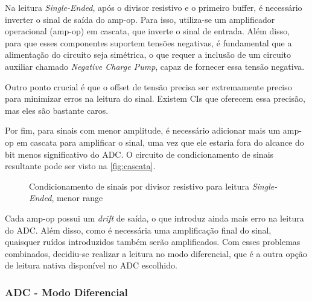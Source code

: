 Na leitura \textit{Single-Ended}, após o divisor resistivo e o primeiro buffer, é necessário inverter o sinal de saída do \gls{amp-op}. Para isso, utiliza-se um amplificador operacional (amp-op) em cascata, que inverte o sinal de entrada. Além disso, para que esses componentes suportem tensões negativas, é fundamental que a alimentação do circuito seja simétrica, o que requer a inclusão de um circuito auxiliar chamado \textit{Negative Charge Pump}, capaz de fornecer essa tensão negativa.

Outro ponto crucial é que o offset de tensão precisa ser extremamente preciso para minimizar erros na leitura do sinal. Existem \gls{CI}s que oferecem essa precisão, mas eles são bastante caros.

Por fim, para sinais com menor amplitude, é necessário adicionar mais um amp-op em cascata para amplificar o sinal, uma vez que ele estaria fora do alcance do bit menos significativo do \gls{ADC}. O circuito de condicionamento de sinais resultante pode ser visto na \autoref{fig:cascata}.

\begin{figure}[htb!]
    \caption{Condicionamento de sinais por divisor resistivo para leitura \textit{Single-Ended}, menor range}
    \label{fig:cascata}
    \fonte{}
\end{figure}

Cada amp-op possui um \textit{drift} de saída, o que introduz ainda mais erro na leitura do \gls{ADC}. Além disso, como é necessária uma amplificação final do sinal, quaisquer ruídos introduzidos também serão amplificados. Com esses problemas combinados, decidiu-se realizar a leitura no modo diferencial, que é a outra opção de leitura nativa disponível no \gls{ADC} escolhido.

\subsubsection{ADC - Modo Diferencial}\label{modo-diferencial}

